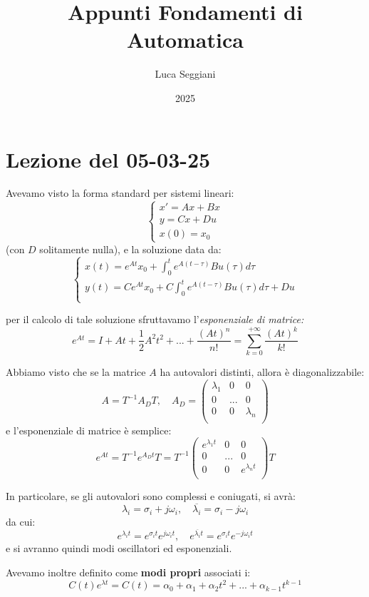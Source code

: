 \documentclass[a4paper,11pt]{article}
\title{Appunti Fondamenti di Automatica}
\author{Luca Seggiani}
\date{2025}
\begin{document}
\section{Lezione del 05-03-25}

\thispagestyle{empty}
\pagestyle{fancy}

Avevamo visto la forma standard per sistemi lineari:
\[
	\begin{cases}
		x' = Ax + Bx \\
		y = Cx + Du \\
		x(0) = x_0
	\end{cases}
\]
(con $D$ solitamente nulla), e la soluzione data da:
\[
	\begin{cases}
		x(t) = e^{At} x_0 + \int_0^t e^{A(t - \tau)} Bu(\tau) d\tau \\
		y(t) = Ce^{At} x_0 + C\int_0^t e^{A(t - \tau)} Bu(\tau) d\tau + Du \\
	\end{cases}
\]

per il calcolo di tale soluzione sfruttavamo l'\textit{esponenziale di matrice:}
$$
e^{At} = I + At + \frac{1}{2}A^2t^2+ ... + \frac{(At)^n}{n!} = \sum_{k = 0}^{+\infty} \frac{(At)^k}{k!} 
$$

Abbiamo visto che se la matrice $A$ ha autovalori distinti, allora è diagonalizzabile:
$$
A = T^{-1} A_D T, \quad A_D = \begin{pmatrix}
	\lambda_1 & 0 & 0 \\
	0 & ... & 0 \\
	0 & 0 & \lambda_n \\
\end{pmatrix}
$$
e l'esponenziale di matrice è semplice:
$$
e^{At} = T^{-1} e^{A_D t} T = T^{-1} \begin{pmatrix}
	e^{\lambda_1 t} & 0 & 0 \\
	0 & ... & 0 \\
	0 & 0 & e^{\lambda_n t} \\
\end{pmatrix} T
$$

In particolare, se gli autovalori sono complessi e coniugati, si avrà:
$$
\lambda_i = \sigma_i + j \omega_i, \quad \overline{\lambda_i} = \sigma_i - j \omega_i 
$$
da cui:
$$
e^{\lambda_i t} = e^{\sigma_i t} e^{j\omega_i t}, \quad e^{\overline{\lambda_i} t} = e^{\sigma_i t} e^{-j\omega_i t}
$$
e si avranno quindi modi oscillatori ed esponenziali.

Avevamo inoltre definito come \textbf{modi propri} associati i:
$$
C(t) e^{\lambda t} = C(t) = \alpha_0 + \alpha_1 + \alpha_2 t^2 + ... + \alpha_{k - 1} t^{k -1}
$$
\end{document}
